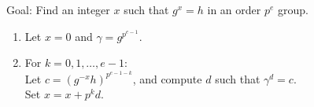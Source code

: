 Goal: Find an integer $x$ such that $g^x = h$ in an order $p^e$ group.
\begin{enumerate}
    \item Let $x=0$ and $\gamma=g^{p^{e-1}}$.
    \item For $k=0,1,\dots,e-1$: \\
        Let $c=(g^{-x}h)^{p^{e-1-k}}$, and compute $d$ such that $\gamma^d=c$.\\
        Set $x=x+p^kd$.
\end{enumerate}

